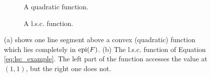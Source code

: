     \begin{figure}[ht]
        \centering
        \begin{subfigure}[b]{0.4\textwidth}
        \caption{A quadratic function.}
        \end{subfigure}
        \begin{subfigure}[b]{0.4\textwidth}
        \caption{A l.s.c. function.}
        \end{subfigure}
        \caption{(a) shows one line segment above a convex (quadratic) function which lies completely in $\textnormal{epi}(F)$. (b) The l.s.c. function of Equation \ref{eq:lsc_example}. The left part of the function accesses the value at $(1, 1)$, but the right one does not.}
        \label{fig:convex_function}
    \end{figure}


